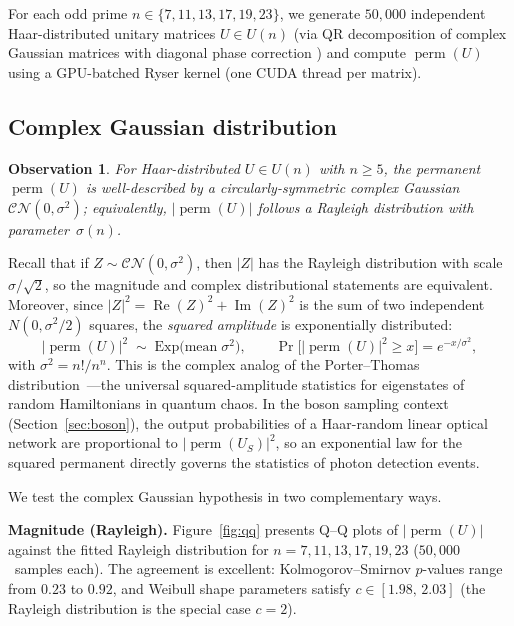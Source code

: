 \documentclass[11pt]{amsart}
\newtheorem{observation}[theorem]{Observation}
\theoremstyle{definition}
\theoremstyle{remark}
\DeclareMathOperator{\perm}{perm}
\begin{document}
For each odd prime $n\in\{7,11,13,17,19,23\}$, we generate $50{,}000$
independent Haar-distributed unitary matrices $U\in U(n)$ (via QR
decomposition of complex Gaussian matrices with diagonal phase
correction \cite{Mezzadri07}) and compute $\perm(U)$ using a
GPU-batched Ryser kernel (one CUDA thread per matrix).

\subsection{Complex Gaussian distribution}

\begin{observation}\label{obs:rayleigh}
For Haar-distributed $U\in U(n)$ with $n\ge 5$, the permanent
$\perm(U)$ is well-described by a circularly-symmetric complex
Gaussian $\mathcal{CN}(0,\sigma^2)$; equivalently, $|\perm(U)|$
follows a Rayleigh distribution with parameter~$\sigma(n)$.
\end{observation}

Recall that if $Z\sim\mathcal{CN}(0,\sigma^2)$, then
$|Z|$ has the Rayleigh distribution with scale $\sigma/\sqrt{2}$,
so the magnitude and complex distributional statements are
equivalent.  Moreover, since
$|Z|^2=\operatorname{Re}(Z)^2+\operatorname{Im}(Z)^2$ is the sum of
two independent $N(0,\sigma^2\!/2)$ squares, the \emph{squared
amplitude} is exponentially distributed:
\begin{equation}\label{eq:exp}
  |\perm(U)|^2 \;\sim\; \mathrm{Exp}\!\bigl(\text{mean}\;\sigma^2\bigr),
  \qquad
  \Pr\bigl[|\perm(U)|^2 \ge x\bigr] = e^{-x/\sigma^2},
\end{equation}
with $\sigma^2=n!/n^n$.  This is the complex analog of the
Porter--Thomas distribution~\cite{PorterThomas56}---the universal
squared-amplitude statistics for eigenstates of random Hamiltonians in
quantum chaos.  In the boson sampling context (Section~\ref{sec:boson}),
the output probabilities of a Haar-random linear optical network are
proportional to $|\perm(U_S)|^2$, so an exponential law for the
squared permanent directly governs the statistics of photon detection
events.

We test the complex Gaussian hypothesis in two complementary ways.

\medskip\noindent\textbf{Magnitude (Rayleigh).}
Figure~\ref{fig:qq} presents Q--Q plots of $|\perm(U)|$ against the
fitted Rayleigh distribution for $n=7,11,13,17,19,23$
($50{,}000$~samples each).  The agreement is excellent: Kolmogorov--Smirnov
$p$-values range from $0.23$ to $0.92$, and Weibull shape parameters
satisfy $c\in[1.98,\,2.03]$ (the Rayleigh distribution is the special
case $c=2$).
\end{document}
